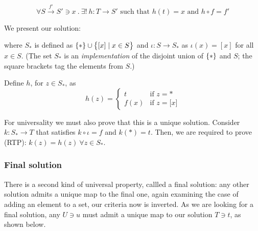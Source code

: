 \begin{equation*}
  \forall S \overset{f'}{\rightarrow} S' \ni x \ .\
  \exists!\ h : T \rightarrow S' \text{ such that }
  h(t) = x \text{ and }
  h \circ f = f'
\end{equation*}

We present our solution:
\begin{center}
\end{center}

where $S_\ast$ is defined as
$\{  \ast  \} \cup \big\{  \lbrack x\rbrack \mid x \in S  \big\}$
and $\iota: S \to S_\ast$ as $\iota(x)=[x]$ for all $x\in S$.
%
(The set $S_\ast$ is an \emph{implementation} of the disjoint union of
$\{ * \}$ and $S$; the square brackets tag the elements from $S$.)

Define $h$, for $z\in S_\ast$, as
\begin{equation*}
    h(z) = \begin{cases}
        t & \text{if } z = \ast\\
        f(x) & \text{if } z = \lbrack x \rbrack
    \end{cases}
\end{equation*}

For universality we must also prove that this is a unique solution.
Consider $k:S_\ast\to T$ that satisfies $k \circ \iota = f$ and
$k(\ast) = t$. Then, we are required to prove (RTP):
$k(z) = h(z)\ \forall z \in S_\ast$.

\subsubsection*{Final solution}

There is a second kind of universal property, callled a final solution: any
other solution admits a unique map to the final one, again examining the case
of adding an element to a set, our criteria now is inverted. As we are looking
for a final solution, any $U\ni u$ must admit a unique map to our solution
$T\ni t$, as shown below.
\begin{center}
\end{center}

